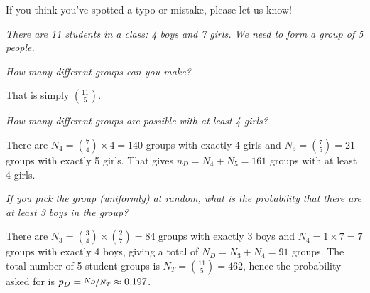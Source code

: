 \documentclass[a4paper,10pt,landscape,twocolumn]{scrartcl}
\begin{document}
\solutions


\noindent
If you think you've spotted a typo or mistake, please let us know!


\begin{exercise}[]
  {\itshape
  There are 11 students in a class: 4 boys and 7 girls. 
  We need to form a group of 5 people.}

  \begin{subex}\itshape
    How many different groups can you make?
  \end{subex}
  
  \begin{solution}
  	That is simply $ 11 \choose 5$.
  \end{solution}


  \begin{subex}\itshape
  	How many different groups are possible with at least 4 girls?
  \end{subex}  
  
  \begin{solution}
    There are $N_4 = {7 \choose 4} \times 4 = 140$ groups with exactly 4 girls 
    and $N_5 = {7 \choose 5} = 21$ groups with exactly 5 girls. 
    That gives $n_D = N_4 + N_5 = 161$ groups with at least 4 girls.
  \end{solution}

  \begin{subex}\itshape
    If you pick the group (uniformly) at random, 
    what is the probability that there are at least 3 boys in the group?
  \end{subex}
  
  \begin{solution}
    There are $N_3 = {3 \choose 4} \times {2 \choose 7} = 84$ groups 
    with exactly 3 boys and $N_4 = 1 \times 7 = 7$ groups with exactly 4 boys,
    giving a total of $N_D = N_3 + N_4 = 91$ groups.
    The total number of 5-student groups is $N_T = {11 \choose 5} = 462$, 
    hence the probability asked for is $p_D = \nicefrac{N_D}{N_T} \approx
0.197$.
  \end{solution}
\end{exercise}

\end{document}
